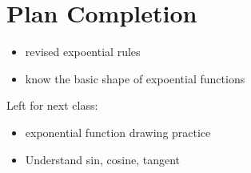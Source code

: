 \documentclass[12pt]{article}
\begin{document}
\section{Plan Completion}
\begin{itemize}
    \item revised expoential rules
    \item know the basic shape of expoential functions
\end{itemize}
Left for next class: 
\begin{itemize}
    \item exponential function drawing practice
    \item Understand sin, cosine, tangent
\end{itemize}
\end{document}
